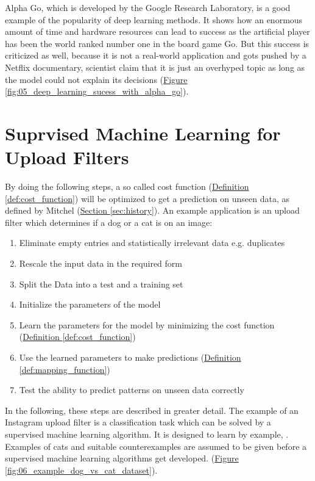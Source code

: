 Alpha Go, which is developed by the Google Research Laboratory, is a good example of the popularity of deep learning methods. It shows how an enormous amount of time and hardware resources can lead to success as the artificial player has been the world ranked number one in the board game Go. But this success is criticized as well, because it is not a real-world application and gots pushed by a Netflix documentary, scientist claim that it is just an overhyped topic as long as the model could not explain its decisions (\hyperref[fig:05_deep_learning_sucess_with_alpha_go]{Figure \ref{fig:05_deep_learning_sucess_with_alpha_go}}).

\section{Suprvised Machine Learning for Upload Filters}
\label{sec:supervised_learning}
By doing the following steps, a so called cost function (\hyperref[def:cost_function]{Definition \ref{def:cost_function}}) will be optimized to get a prediction on unseen data, as defined by Mitchel (\hyperref[sec:history]{Section \ref{sec:history}}). An example application is an upload filter which determines if a dog or a cat is on an image:

\begin{enumerate}
	\itemsep-0.8em 
	\item Eliminate empty entries and statistically irrelevant data e.g. duplicates
	\item Rescale the input data in the required form
	\item Split the Data into a test and a training set
	\item Initialize the parameters of the model
	\item Learn the parameters for the model by minimizing the cost function (\hyperref[def:cost_function]{Definition \ref{def:cost_function}})
	\item Use the learned parameters to make predictions (\hyperref[def:mapping_function]{Definition \ref{def:mapping_function}})
	\item Test the ability to predict patterns on unseen data correctly
\end{enumerate}

In the following, these steps are described in greater detail. The example of an Instagram upload filter is a classification task which can be solved by a supervised machine learning algorithm. It is designed to learn by example, \cite[p. 3 - 4]{Murphy2012}. Examples of cats and suitable counterexamples are assumed to be given before a supervised machine learning algorithms get developed.   (\hyperref[fig:06_example_dog_vs_cat_dataset]{Figure \ref{fig:06_example_dog_vs_cat_dataset}}).\\\\

